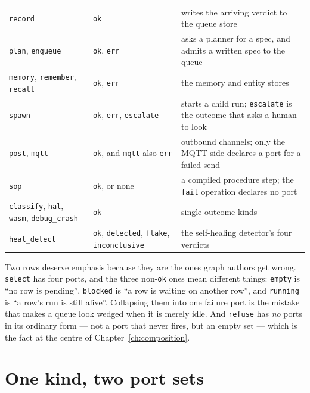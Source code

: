 \begin{longtable}{@{}p{}p{}p{}@{}}
	\texttt{record} & \texttt{ok} & writes the arriving verdict to the queue store \\
	\texttt{plan}, \texttt{enqueue} & \texttt{ok}, \texttt{err} & asks a planner for a spec, and admits
	a written spec to the queue \\
	\texttt{memory}, \texttt{remember}, \texttt{recall} & \texttt{ok}, \texttt{err} & the memory and
	entity stores \\
	\texttt{spawn} & \texttt{ok}, \texttt{err}, \texttt{escalate} & starts a child run;
	\texttt{escalate} is the outcome that asks a human to look \\
	\texttt{post}, \texttt{mqtt} & \texttt{ok}, and \texttt{mqtt} also \texttt{err} & outbound
	channels; only the MQTT side declares a port for a failed send \\
	\texttt{sop} & \texttt{ok}, or none & a compiled procedure step; the \texttt{fail} operation
	declares no port \\
	\texttt{classify}, \texttt{hal}, \texttt{wasm}, \texttt{debug\_crash} & \texttt{ok} &
	single-outcome kinds \\
	\texttt{heal\_detect} & \texttt{ok}, \texttt{detected}, \texttt{flake}, \texttt{inconclusive} &
	the self-healing detector's four verdicts \\
	\bottomrule
\end{longtable}

Two rows deserve emphasis because they are the ones graph authors get wrong. \texttt{select} has
four ports, and the three non-\texttt{ok} ones mean different things: \texttt{empty} is \enquote{no
row is pending}, \texttt{blocked} is \enquote{a row is waiting on another row}, and
\texttt{running} is \enquote{a row's run is still alive}. Collapsing them into one failure port is
the mistake that makes a queue look wedged when it is merely idle. And \texttt{refuse} has
\emph{no} ports in its ordinary form --- not a port that never fires, but an empty set --- which is
the fact at the centre of Chapter~\ref{ch:composition}.

\section{One kind, two port sets}

